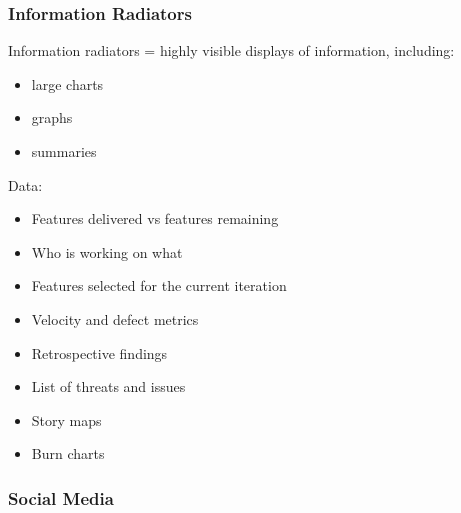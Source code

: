 \documentclass[letterpaper,10pt,english]{jupyterBook}
\begin{document}
\subsubsection{Information Radiators}
\label{\detokenize{APM/agile:information-radiators}}
\sphinxAtStartPar
Information radiators = highly visible displays of information, including:
\begin{itemize}
\item {} 
\sphinxAtStartPar
large charts

\item {} 
\sphinxAtStartPar
graphs

\item {} 
\sphinxAtStartPar
summaries

\end{itemize}

\sphinxAtStartPar
Data:
\begin{itemize}
\item {} 
\sphinxAtStartPar
Features delivered vs features remaining

\item {} 
\sphinxAtStartPar
Who is working on what

\item {} 
\sphinxAtStartPar
Features selected for the current iteration

\item {} 
\sphinxAtStartPar
Velocity and defect metrics

\item {} 
\sphinxAtStartPar
Retrospective findings

\item {} 
\sphinxAtStartPar
List of threats and issues

\item {} 
\sphinxAtStartPar
Story maps

\item {} 
\sphinxAtStartPar
Burn charts

\end{itemize}


\subsubsection{Social Media}
\label{\detokenize{APM/agile:social-media}}
\end{document}
